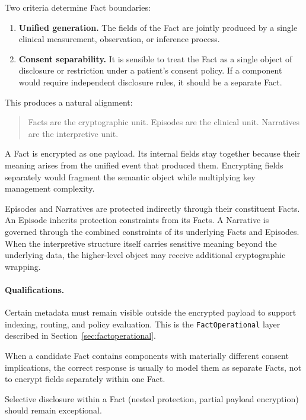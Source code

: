 \documentclass[11pt]{article}
\begin{document}
Two criteria determine Fact boundaries:

\begin{enumerate}
\item \textbf{Unified generation.} The fields of the Fact are jointly
  produced by a single clinical measurement, observation, or inference
  process.

\item \textbf{Consent separability.} It is sensible to treat the Fact
  as a single object of disclosure or restriction under a patient's
  consent policy. If a component would require independent disclosure
  rules, it should be a separate Fact.
\end{enumerate}

This produces a natural alignment:

\begin{quote}
Facts are the cryptographic unit. Episodes are the clinical unit.
Narratives are the interpretive unit.
\end{quote}

A Fact is encrypted as one payload. Its internal fields stay together
because their meaning arises from the unified event that produced them.
Encrypting fields separately would fragment the semantic object while
multiplying key management complexity.

Episodes and Narratives are protected indirectly through their
constituent Facts. An Episode inherits protection constraints from its
Facts. A Narrative is governed through the combined constraints of its
underlying Facts and Episodes. When the interpretive structure itself
carries sensitive meaning beyond the underlying data, the higher-level
object may receive additional cryptographic wrapping.

\paragraph{Qualifications.}

Certain metadata must remain visible outside the encrypted payload to
support indexing, routing, and policy evaluation. This is the
\texttt{FactOperational} layer described in Section~\ref{sec:factoperational}.

When a candidate Fact contains components with materially different
consent implications, the correct response is usually to model them as
separate Facts, not to encrypt fields separately within one Fact.

Selective disclosure within a Fact (nested protection, partial payload
encryption) should remain exceptional.
\end{document}

